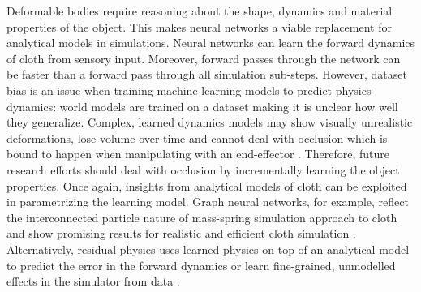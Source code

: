 \documentclass[\home/main.tex]{subfiles}
\begin{document}
Deformable bodies require reasoning about the shape, dynamics and material properties of the object. This makes neural networks a viable replacement for analytical models in simulations. Neural networks can learn the forward dynamics of cloth from sensory input. Moreover, forward passes through the network can be faster than a forward pass through all simulation sub-steps. 
However, dataset bias is an issue when training machine learning models to predict physics dynamics: world models are trained on a dataset making it is unclear how well they generalize. Complex, learned dynamics models may show visually unrealistic deformations, lose volume over time and cannot deal with occlusion which is bound to happen when manipulating with an end-effector \autocite{Mrowca2018, Li2018}. Therefore, future research efforts should deal with occlusion by incrementally learning the object properties. 
Once again, insights from analytical models of cloth can be exploited in parametrizing the learning model. Graph neural networks, for example, reflect the interconnected particle nature of mass-spring simulation approach to cloth and show promising results for realistic and efficient cloth simulation \autocite{pfaff2021learning}. Alternatively, residual physics uses learned physics on top of an analytical model to predict the error in the forward dynamics \autocite{Golemo2018} or learn fine-grained, unmodelled effects in the simulator from data \autocite{heiden2021neuralsim}.
 
\end{document}
